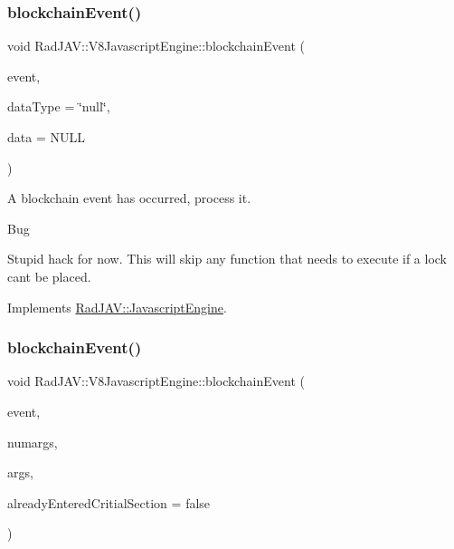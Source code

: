 \subsubsection{\texorpdfstring{blockchain\+Event()}{blockchainEvent()}\hspace{0.1cm}{\footnotesize\ttfamily [1/2]}}
{\footnotesize\ttfamily void Rad\+J\+A\+V\+::\+V8\+Javascript\+Engine\+::blockchain\+Event (\begin{DoxyParamCaption}\item[{\mbox{\hyperlink{class_rad_j_a_v_1_1_string}{String}}}]{event,  }\item[{\mbox{\hyperlink{class_rad_j_a_v_1_1_string}{String}}}]{data\+Type = {\ttfamily \char`\"{}null\char`\"{}},  }\item[{void $\ast$}]{data = {\ttfamily NULL} }\end{DoxyParamCaption})\hspace{0.3cm}{\ttfamily [virtual]}}



A blockchain event has occurred, process it. 

\begin{DoxyRefDesc}{Bug}
\item[\mbox{\hyperlink{bug__bug000002}{Bug}}]Stupid hack for now. This will skip any function that needs to execute if a lock can\textquotesingle{}t be placed. \end{DoxyRefDesc}


Implements \mbox{\hyperlink{class_rad_j_a_v_1_1_javascript_engine_a91ebe8029a9658f66d9c39356eea2d80}{Rad\+J\+A\+V\+::\+Javascript\+Engine}}.

\mbox{\label{class_rad_j_a_v_1_1_v8_javascript_engine_adc3d7c751504d623017852ea8bfde1d2}} 
\subsubsection{\texorpdfstring{blockchain\+Event()}{blockchainEvent()}\hspace{0.1cm}{\footnotesize\ttfamily [2/2]}}
{\footnotesize\ttfamily void Rad\+J\+A\+V\+::\+V8\+Javascript\+Engine\+::blockchain\+Event (\begin{DoxyParamCaption}\item[{\mbox{\hyperlink{class_rad_j_a_v_1_1_string}{String}}}]{event,  }\item[{R\+J\+I\+NT}]{numargs,  }\item[{v8\+::\+Local$<$ v8\+::\+Value $>$ $\ast$}]{args,  }\item[{R\+J\+B\+O\+OL}]{already\+Entered\+Critial\+Section = {\ttfamily false} }\end{DoxyParamCaption})}

